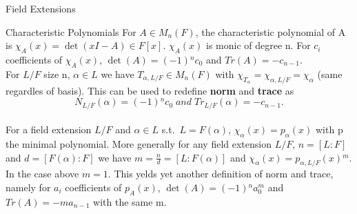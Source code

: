 \documentclass[12pt, letterpaper]{article}
\begin{document}
\begin{section}{Field Extensions}
\begin{subsection}{Characteristic Polynomials}
    For \(A \in M_{n}(F)\), the characteristic polynomial of A is \(\chi_{A}(x)
    = \det(xI - A) \in F[x]\). \(\chi_{A}(x)\) is monic of degree n. For
    \(c_{i}\) coefficients of \(\chi_{A}(x)\), \(\det(A) = (-1){}^{n} c_{0}\)
    and \(Tr(A) = -c_{n - 1}\). \\
    For \(L / F\) size n, \(\alpha \in L\) we have \(T_{\alpha, L / F} \in
    M_{n}(F)\) with \(\chi_{T_{\alpha}} = \chi_{\alpha, L / F} =
    \chi_{\alpha}\) (same regardles of basis). This can be used to redefine
    \textbf{norm} and \textbf{trace} as \[N_{L / F}(\alpha) = (-1){}^{n} c_{0}
      \; and \; Tr_{L / F}(\alpha) = -c_{n - 1}.\] \\
    For a field extension \(L / F\) and \(\alpha \in L\) s.t.\
    \(L = F(\alpha)\), \(\chi_{\alpha}(x) = p_{\alpha}(x)\) with p the minimal
    polynomial. More generally for any field extension \(L / F\), \(n =
    [L : F]\) and \(d = [F(\alpha) : F]\) we have \(m = \frac{n}{d} =
    [L : F(\alpha)]\) and \(\chi_{\alpha}(x) = p_{\alpha, L / F}(x){}^{m}\). In
    the case above \(m = 1\). This yelds yet another definition of norm and
    trace, namely for \(a_{i}\) coefficients of \(p_{A}(x)\), \(\det(A) =
    (-1){}^{n} a_{0}^{m}\) and \(Tr(A) = -ma_{n - 1}\) with the same m.

  \end{subsection}

\end{section}
\end{document}
